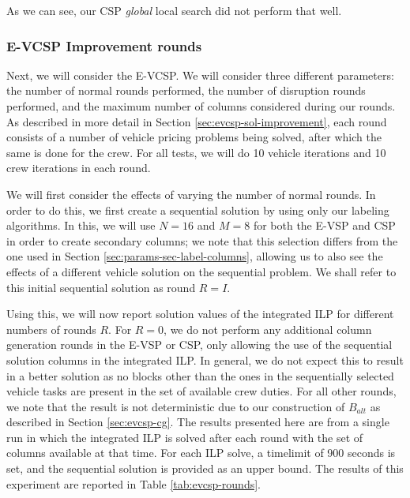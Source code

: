 \documentclass[]{article}
\begin{document}
As we can see, our CSP \emph{global} local search did not perform that well. 

\subsubsection{E-VCSP Improvement rounds}
Next, we will consider the E-VCSP. We will consider three different parameters: the number of normal rounds performed, the number of disruption rounds performed, and the maximum number of columns considered during our rounds. As described in more detail in Section \ref{sec:evcsp-sol-improvement}, each round consists of a number of vehicle pricing problems being solved, after which the same is done for the crew. For all tests, we will do 10 vehicle iterations and 10 crew iterations in each round. 

We will first consider the effects of varying the number of normal rounds. In order to do this, we first create a sequential solution by using only our labeling algorithms. In this, we will use $N=16$ and $M=8$ for both the E-VSP and CSP in order to create secondary columns; we note that this selection differs from the one used in Section \ref{sec:params-sec-label-columns}, allowing us to also see the effects of a different vehicle solution on the sequential problem.  We shall refer to this initial sequential solution as round $R = I$.

Using this, we will now report solution values of the integrated ILP for different numbers of rounds $R$. For $R=0$, we do not perform any additional column generation rounds in the E-VSP or CSP, only allowing the use of the sequential solution columns in the integrated ILP. In general, we do not expect this to result in a better solution as no blocks other than the ones in the sequentially selected vehicle tasks are present in the set of available crew duties. For all other rounds, we note that the result is not deterministic due to our construction of $B_{alt}$ as described in Section \ref{sec:evcsp-cg}. The results presented here are from a single run in which the integrated ILP is solved after each round with the set of columns available at that time. For each ILP solve, a timelimit of 900 seconds is set, and the sequential solution is provided as an upper bound. The results of this experiment are reported in Table \ref{tab:evcsp-rounds}.
\end{document}
